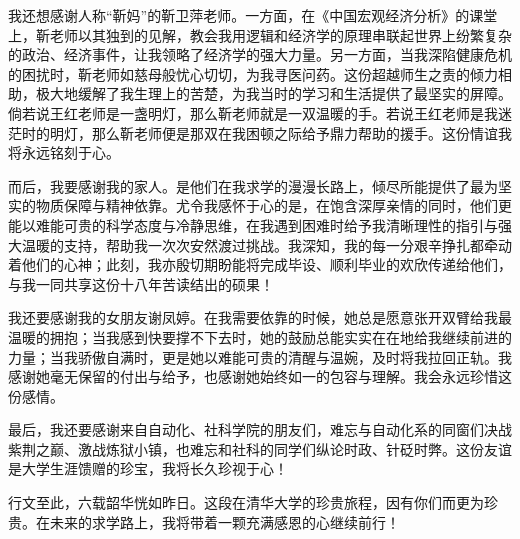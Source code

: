 \begin{acknowledgements}
我还想感谢人称“靳妈”的靳卫萍老师。一方面，在《中国宏观经济分析》的课堂上，靳老师以其独到的见解，教会我用逻辑和经济学的原理串联起世界上纷繁复杂的政治、经济事件，让我领略了经济学的强大力量。另一方面，当我深陷健康危机的困扰时，靳老师如慈母般忧心切切，为我寻医问药。这份超越师生之责的倾力相助，极大地缓解了我生理上的苦楚，为我当时的学习和生活提供了最坚实的屏障。倘若说王红老师是一盏明灯，那么靳老师就是一双温暖的手。若说王红老师是我迷茫时的明灯，那么靳老师便是那双在我困顿之际给予鼎力帮助的援手。这份情谊我将永远铭刻于心。​

而后，我要感谢我的家人。是他们在我求学的漫漫长路上，倾尽所能提供了最为坚实的物质保障与精神依靠。尤令我感怀于心的是，在饱含深厚亲情的同时，他们更能以难能可贵的科学态度与冷静思维，在我遇到困难时给予我清晰理性的指引与强大温暖的支持，帮助我一次次安然渡过挑战。我深知，我的每一分艰辛挣扎都牵动着他们的心神；此刻，我亦殷切期盼能将完成毕设、顺利毕业的欢欣传递给他们，与我一同共享这份十八年苦读结出的硕果！​

我还要感谢我的女朋友谢凤婷。在我需要依靠的时候，她总是愿意张开双臂给我最温暖的拥抱；当我感到快要撑不下去时，她的鼓励总能实实在在地给我继续前进的力量；当我骄傲自满时，更是她以难能可贵的清醒与温婉，及时将我拉回正轨。我感谢她毫无保留的付出与给予，也感谢她始终如一的包容与理解。我会永远珍惜这份感情。

最后，我还要感谢来自自动化、社科学院的朋友们，难忘与自动化系的同窗们决战紫荆之巅、激战炼狱小镇，也难忘和社科的同学们纵论时政、针砭时弊。这份友谊是大学生涯馈赠的珍宝，我将长久珍视于心！

行文至此，六载韶华恍如昨日。这段在清华大学的珍贵旅程，因有你们而更为珍贵。在未来的求学路上，我将带着一颗充满感恩的心继续前行！

\end{acknowledgements}

